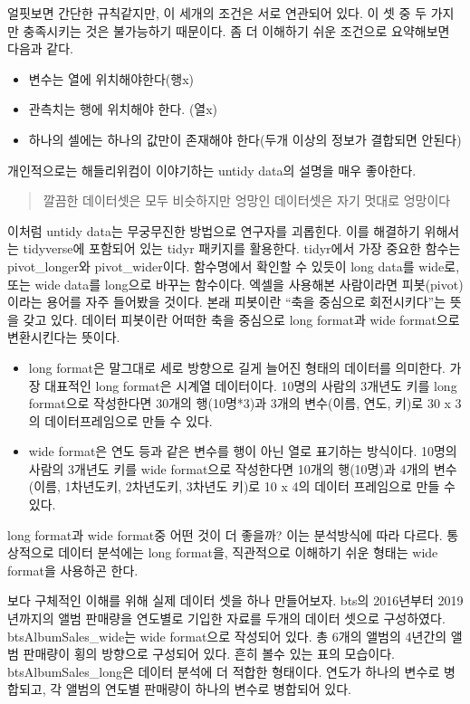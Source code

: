 \documentclass[
]{book}
\providecommand{\tightlist}{%
  \setlength{\itemsep}{0pt}\setlength{\parskip}{0pt}}
\theoremstyle{definition}
\theoremstyle{definition}
\theoremstyle{definition}
\theoremstyle{definition}
\theoremstyle{remark}
\begin{document}
얼핏보면 간단한 규칙같지만, 이 세개의 조건은 서로 연관되어 있다. 이 셋 중 두 가지만 충족시키는 것은 불가능하기 때문이다. 좀 더 이해하기 쉬운 조건으로 요약해보면 다음과 같다.

\begin{itemize}
\tightlist
\item
  변수는 열에 위치해야한다(행x)
\item
  관측치는 행에 위치해야 한다. (열x)
\item
  하나의 셀에는 하나의 값만이 존재해야 한다(두개 이상의 정보가 결합되면 안된다)
\end{itemize}

개인적으로는 해들리위컴이 이야기하는 untidy data의 설명을 매우 좋아한다.

\begin{quote}
깔끔한 데이터셋은 모두 비슷하지만 엉망인 데이터셋은 자기 멋대로 엉망이다
\end{quote}

이처럼 untidy data는 무궁무진한 방법으로 연구자를 괴롭힌다. 이를 해결하기 위해서는 tidyverse에 포함되어 있는 tidyr 패키지를 활용한다. tidyr에서 가장 중요한 함수는 pivot\_longer와 pivot\_wider이다. 함수명에서 확인할 수 있듯이 long data를 wide로, 또는 wide data를 long으로 바꾸는 함수이다.
엑셀을 사용해본 사람이라면 피봇(pivot)이라는 용어를 자주 들어봤을 것이다. 본래 피봇이란 ``축을 중심으로 회전시키다''는 뜻을 갖고 있다. 데이터 피봇이란 어떠한 축을 중심으로 long format과 wide format으로 변환시킨다는 뜻이다.

\begin{itemize}
\item
  long format은 말그대로 세로 방향으로 길게 늘어진 형태의 데이터를 의미한다. 가장 대표적인 long format은 시계열 데이터이다. 10명의 사람의 3개년도 키를 long format으로 작성한다면 30개의 행(10명*3)과 3개의 변수(이름, 연도, 키)로 30 x 3의 데이터프레임으로 만들 수 있다.
\item
  wide format은 연도 등과 같은 변수를 행이 아닌 열로 표기하는 방식이다. 10명의 사람의 3개년도 키를 wide format으로 작성한다면 10개의 행(10명)과 4개의 변수(이름, 1차년도키, 2차년도키, 3차년도 키)로 10 x 4의 데이터 프레임으로 만들 수 있다.
\end{itemize}

long format과 wide format중 어떤 것이 더 좋을까? 이는 분석방식에 따라 다르다. 통상적으로 데이터 분석에는 long format을, 직관적으로 이해하기 쉬운 형태는 wide format을 사용하곤 한다.

보다 구체적인 이해를 위해 실제 데이터 셋을 하나 만들어보자. bts의 2016년부터 2019년까지의 앨범 판매량을 연도별로 기입한 자료를 두개의 데이터 셋으로 구성하였다. btsAlbumSales\_wide는 wide format으로 작성되어 있다. 총 6개의 앨범의 4년간의 앨범 판매량이 횡의 방향으로 구성되어 있다. 흔히 볼수 있는 표의 모습이다. btsAlbumSales\_long은 데이터 분석에 더 적합한 형태이다. 연도가 하나의 변수로 병합되고, 각 앨범의 연도별 판매량이 하나의 변수로 병합되어 있다.
\end{document}
